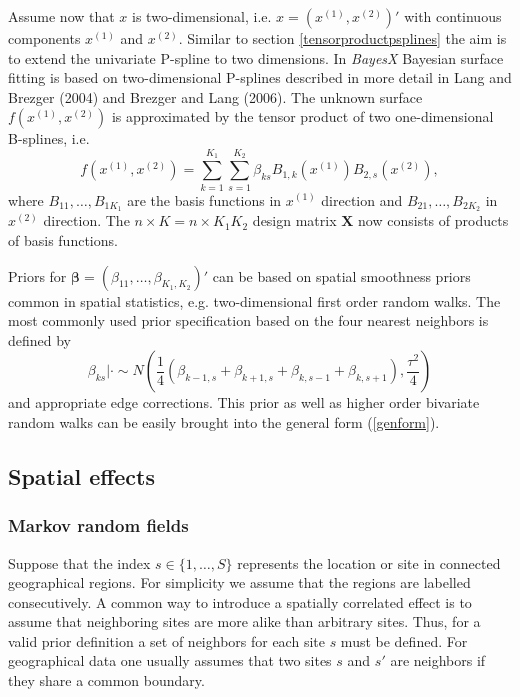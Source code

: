 \documentclass[11pt,a4paper,twoside]{bayesxarticle}
\def \betavec {\boldsymbol{\beta}}
\def \Xvec {\mathbf{X}}
\begin{document}
Assume now that $x$ is two-dimensional, i.e. $x =
\left(x^{(1)},x^{(2)}\right)'$ with continuous components $x^{(1)}$
and $x^{(2)}$. Similar to section \ref{tensorproductpsplines} the
aim is to extend the univariate P-spline to two dimensions. In {\em
BayesX} Bayesian surface fitting is based on two-dimensional
P-splines described in more detail in Lang and Brezger (2004) and
Brezger and Lang (2006). The unknown surface $f(x^{(1)},x^{(2)})$ is
approximated by the tensor product of two one-dimensional B-splines,
i.e.
$$
f\left(x^{(1)},x^{(2)}\right) = \sum_{k=1}^{K_1}
\sum_{s=1}^{K_2} \beta_{ks} B_{1,k}(x^{(1)})
B_{2,s} (x^{(2)}),
$$
where $B_{11},\dots,B_{1K_1}$ are the basis functions in $x^{(1)}$ direction and
$B_{21},\dots,B_{2K_2}$ in $x^{(2)}$ direction.
The $n \times K = n \times K_1 K_2$ design matrix $\Xvec$ now consists of
products of basis functions.

Priors for
$\betavec = (\beta_{11},\dots,\beta_{K_1,K_2})'$ can be based on
spatial smoothness priors common in spatial statistics, e.g.
two-dimensional first order random walks. The most commonly used
prior specification based on the four nearest neighbors is defined
by
\begin{equation}
\label{2dimrw1} \beta_{ks} | \cdot \sim N \left(
\frac{1}{4} ( \beta_{k-1,s}+ \beta_{k+1,s} +
\beta_{k,s-1} +\beta_{k,s+1}),\frac{\tau^2}{4}
\right)
\end{equation}
and appropriate edge corrections. This
prior as well as higher order bivariate random walks can be easily
brought into the general form (\ref{genform}).


\subsection{Spatial effects} \label{spatial}

\subsubsection{Markov random fields}

Suppose that the index $s \in \{ 1,\dots,S \}$ represents the
location or site in connected geographical regions. For simplicity
we assume that the regions are labelled consecutively. A common way
to introduce a spatially correlated effect is to assume that
neighboring sites are more alike than arbitrary sites. Thus, for a
valid prior definition a set of neighbors for each site $s$ must be
defined. For geographical data one usually assumes that two sites
$s$ and $s'$ are neighbors if they share a common boundary.
\end{document}
